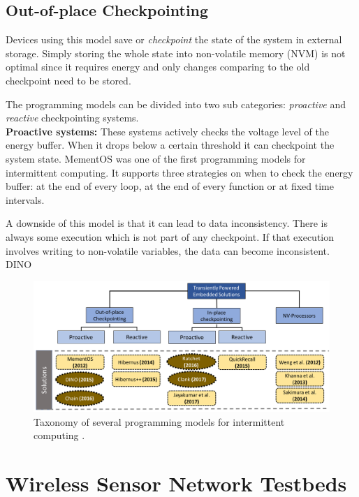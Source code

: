 \subsection{Out-of-place Checkpointing}
Devices using this model save or \textit{checkpoint} the state of the system in external storage. Simply storing the whole state into non-volatile memory (NVM) is not optimal since it requires energy and only changes comparing to the old checkpoint need to be stored.

The programming models can be divided into two sub categories: \textit{proactive} and \textit{reactive} checkpointing systems.\\

\textbf{Proactive systems:} These systems actively checks the voltage level of the energy buffer. When it drops below a certain threshold it can checkpoint the system state. MementOS \cite{ransford2011mementos} was one of the first programming models for intermittent computing. It supports three strategies on when to check the energy buffer: at the end of every loop, at the end of every function or at fixed time intervals.

A downside of this model is that it can lead to data inconsistency. There is always some execution which is not part of any checkpoint. If that execution involves writing to non-volatile variables, the data can become inconsistent. DINO \cite{lucia2015simpler}



\begin{figure}[htb]
	\includegraphics[width=\textwidth]{pics/taxonomy-tpc}
	\caption{Taxonomy of several programming models for intermittent computing \cite{tpcthesis}.}
	\label{fig:programmingmodels}
\end{figure}


\section{Wireless Sensor Network Testbeds}
\label{sec:wireless-sensor-networks}

